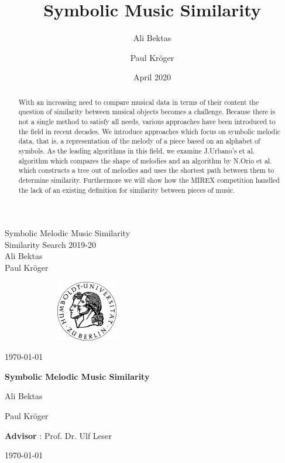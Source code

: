 \documentclass{llncs}
\title{Symbolic Music Similarity}
\author{Ali Bektas \and Paul Kröger}
\date{April 2020}
\begin{document}
	
	\thispagestyle{empty}
   	\begin{center}	
		\vspace{100pt}
		\Huge Symbolic Melodic Music Similarity\\
		\vspace{5pt}
		\Large Similarity Search 2019-20\\
		\vspace{20pt}
		Ali Bektas\\
		Paul Kröger \\
		\vspace{150pt}
		\begin{figure}[h!]
			\centering
	        \includegraphics[width=200px,height=100px,keepaspectratio]{hu-berlin-logo}
        \end{figure}
		\vspace{5pt}
		\Large{\today}
	\end{center}
	
	\newpage
	\tableofcontents
	

	\newpage
	\pagestyle{plain}
	\setcounter{page}{1}
	\begin{center}	

		\large{\textbf{Symbolic Melodic Music Similarity}}\\
		\vspace{5pt} 
		
		\small{Ali Bektas}\\
		\vspace{5pt}

		\small{Paul Kröger}\\
		\vspace{5pt}

		\small{\textbf{Advisor} : Prof. Dr. Ulf Leser}\\
		\vspace{5pt}

		\small{\today}
	\end{center}

	\setcounter{tocdepth}{2}
	

	\begin{abstract}
	With an increasing need to compare  musical data in terms of their content the question of similarity between musical objects becomes a challenge. Because there 
	is not a single method to satisfy all needs, various approaches have been introduced to the field in recent decades. We introduce approaches which focus on symbolic melodic data, that is, a representation of the melody of a piece based on an alphabet of symbols. As the leading algorithms in this field, we examine J.Urbano's et al. algorithm which compares the shape of melodies and an algorithm by N.Orio et al. which constructs a tree out of melodies and uses the shortest path between them to determine similarity. Furthermore we will show how the MIREX competition handled the lack of an existing definition for similarity between pieces of music.
	\end{abstract}
\end{document}

